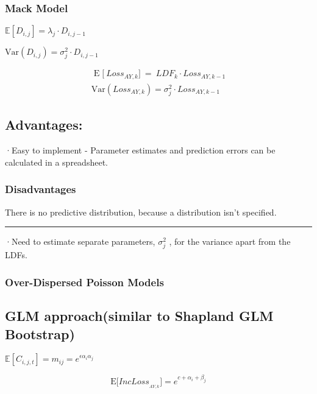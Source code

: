 \documentclass[
]{article}
\begin{document}
\subsubsection{Mack Model}\label{mack-model}

\(\mathbb{E}\left[D_{i,j}\right]=\lambda_j\cdot D_{i,j-1}\)

\(\text{Var}\left(D_{i,j}\right)=\sigma^2_j\cdot D_{i,j-1}\)

\[
\begin{gathered}
\operatorname{E}\bigg[\:Loss_{AY,k}\bigg]\:=\:LDF_{k}\cdot Loss_{AY,k-1} \\
\mathrm{Var}\left(Loss_{AY,k}\right)=\sigma_{j}^{2}\cdot Loss_{AY,k-1}
\end{gathered}
\]

\subsection{Advantages:}\label{advantages-8}

·Easy to implement - Parameter estimates and prediction errors can be
calculated in a spreadsheet.

\subsubsection{Disadvantages}\label{disadvantages-6}

There is no predictive distribution, because a distribution isn't
specified.

\begin{center}\rule{0.5\linewidth}{0.5pt}\end{center}

·Need to estimate separate parameters, \(\sigma_{j}^{2}\) , for the
variance apart from the LDFs.

\subsubsection{Over-Dispersed Poisson
Models}\label{over-dispersed-poisson-models}

\subsection{GLM approach(similar to Shapland GLM
Bootstrap)}\label{glm-approachsimilar-to-shapland-glm-bootstrap}

\(\mathbb{E}\left[C_{i,j,t}\right]=m_{ij}=e^{\epsilon\alpha_i\alpha_j}\)

\[\mathrm{E}\Big[IncLoss_{_{AY,k}}\Big]=e^{c+\alpha_{i}+\beta_{j}}\]
\end{document}
